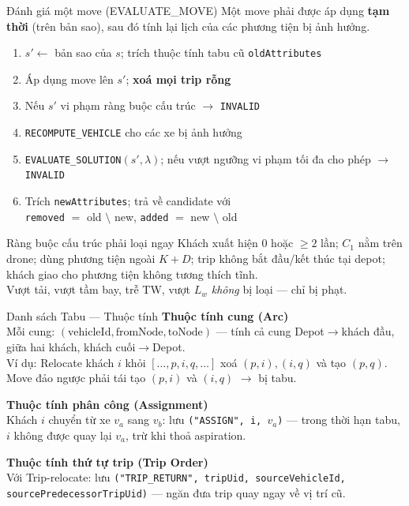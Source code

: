 \documentclass[aspectratio=169]{beamer}
\newcommand{\hl}[1]{\textcolor{blue!60!black}{\textbf{#1}}}
\begin{document}
\begin{frame}{Đánh giá một move (EVALUATE\_MOVE)}
  \small Một move phải được áp dụng \hl{tạm thời} (trên bản sao), sau đó tính lại lịch của các phương tiện bị ảnh hưởng.

  \vspace{2mm}
  \begin{enumerate}
    \item \small $s' \leftarrow$ bản sao của $s$; trích thuộc tính tabu cũ \texttt{oldAttributes}
    \item \small Áp dụng move lên $s'$; \hl{xoá mọi trip rỗng}
    \item \small Nếu $s'$ vi phạm ràng buộc cấu trúc $\to$ \texttt{INVALID}
    \item \small \texttt{RECOMPUTE\_VEHICLE} cho các xe bị ảnh hưởng
    \item \small \texttt{EVALUATE\_SOLUTION}$(s', \lambda)$; nếu vượt ngưỡng vi phạm tối đa cho phép $\to$ \texttt{INVALID}
    \item \small Trích \texttt{newAttributes}; trả về candidate với \\
      \texttt{removed} $=$ old $\setminus$ new, \quad \texttt{added} $=$ new $\setminus$ old
  \end{enumerate}

  \vspace{1mm}
  \begin{alertblock}{Ràng buộc cấu trúc phải loại ngay}
    \small Khách xuất hiện 0 hoặc $\ge 2$ lần; $C_1$ nằm trên drone; dùng phương tiện ngoài $K+D$; trip không bắt đầu/kết thúc tại depot; khách giao cho phương tiện không tương thích tĩnh. \\
    Vượt tải, vượt tầm bay, trễ TW, vượt $L_w$ \emph{không} bị loại — chỉ bị phạt.
  \end{alertblock}
\end{frame}

\begin{frame}{Danh sách Tabu — Thuộc tính}
  \textbf{Thuộc tính cung (Arc)}\\
  \small Mỗi cung: $(\text{vehicleId}, \text{fromNode}, \text{toNode})$ — tính cả cung Depot$\to$khách đầu, giữa hai khách, khách cuối$\to$Depot.\\
  Ví dụ: Relocate khách $i$ khỏi $[\ldots,p,i,q,\ldots]$ xoá $(p,i),(i,q)$ và tạo $(p,q)$. Move đảo ngược phải tái tạo $(p,i)$ và $(i,q)$ $\to$ bị tabu.

  \vspace{2mm}
  \textbf{Thuộc tính phân công (Assignment)}\\
  \small Khách $i$ chuyển từ xe $v_a$ sang $v_b$: lưu \texttt{("ASSIGN", i, }$v_a$\texttt{)} — trong thời hạn tabu, $i$ không được quay lại $v_a$, trừ khi thoả aspiration.

  \vspace{2mm}
  \textbf{Thuộc tính thứ tự trip (Trip Order)}\\
  \small Với Trip-relocate: lưu \texttt{("TRIP\_RETURN", tripUid, sourceVehicleId, sourcePredecessorTripUid)} — ngăn đưa trip quay ngay về vị trí cũ.
\end{frame}
\end{document}
